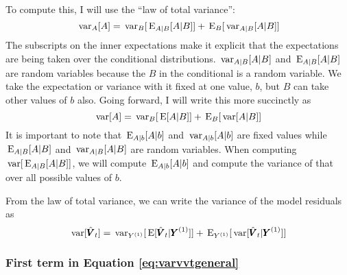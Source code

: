 \documentclass[]{article}
\def\E{\,\textup{\textrm{E}}}
\def\VV{\mbox{$\pmb{V}$}}	\def\vv{\mbox{$\pmb{v}$}}
\def\YY{\mbox{$\pmb{Y}$}}	\def\yy{\mbox{$\pmb{y}$}}
\def\var{\,\textup{\textrm{var}}}
\begin{document}
To compute this, I will use the ``law of total variance'':
\begin{equation}
\var_A[A] = \var_B[\E_{A|B}[A|B]] + \E_B[\var_{A|B}[A|B]]
\end{equation}
The subscripts on the inner expectations make it explicit that the expectations are being taken over the conditional distributions.  $\var_{A|B}[A|B]$ and $\E_{A|B}[A|B]$ are random variables because the $B$ in the conditional is a random variable. We take the expectation or variance with it fixed at one value, $b$, but $B$ can take other values of $b$ also.  Going forward, I will write this more succinctly as
\begin{equation}
\var[A] = \var_B[\E[A|B]] + \E_B[\var[A|B]]
\end{equation}
It is important to note that $\E_{A|b}[A|b]$ and $\var_{A|b}[A|b]$ are fixed values while $\E_{A|B}[A|B]$ and $\var_{A|B}[A|B]$ are random variables. When computing $\var[\E_{A|B}[A|B]]$, we will compute $\E_{A|b}[A|b]$ and compute the variance of that over all possible values of $b$. 

From the law of total variance, we can write the variance of the model residuals as
\begin{equation}\label{eq:varvvtgeneral}
\var[\hat{\VV}_t] = \var_{Y^{(1)}}[\E[\hat{\VV}_t|\YY^{(1)}]] + \E_{Y^{(1)}}[\var[\hat{\VV}_t|\YY^{(1)}]]
\end{equation}

\subsubsection{First term in Equation \ref{eq:varvvtgeneral}}
\end{document}
